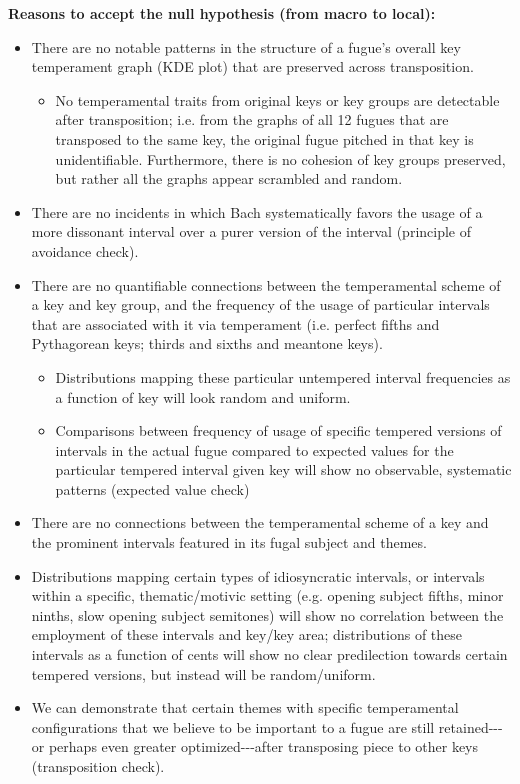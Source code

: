 \textbf{Reasons to accept the null hypothesis (from macro to local):}

\begin{itemize}
\tightlist
\item
  There are no notable patterns in the structure of a fugue's overall
  key temperament graph (KDE plot) that are preserved across
  transposition.

  \begin{itemize}
  \tightlist
  \item
    No temperamental traits from original keys or key groups are
    detectable after transposition; i.e. from the graphs of all 12
    fugues that are transposed to the same key, the original fugue
    pitched in that key is unidentifiable. Furthermore, there is no
    cohesion of key groups preserved, but rather all the graphs appear
    scrambled and random.
  \end{itemize}
\item
  There are no incidents in which Bach systematically favors the usage
  of a more dissonant interval over a purer version of the interval
  (principle of avoidance check).
\item
  There are no quantifiable connections between the temperamental scheme
  of a key and key group, and the frequency of the usage of particular
  intervals that are associated with it via temperament (i.e. perfect
  fifths and Pythagorean keys; thirds and sixths and meantone keys).

  \begin{itemize}
  \tightlist
  \item
    Distributions mapping these particular untempered interval
    frequencies as a function of key will look random and uniform.
  \item
    Comparisons between frequency of usage of specific tempered versions
    of intervals in the actual fugue compared to expected values for the
    particular tempered interval given key will show no observable,
    systematic patterns (expected value check)\\
  \end{itemize}
\item
  There are no connections between the temperamental scheme of a key and
  the prominent intervals featured in its fugal subject and themes.
\item
  Distributions mapping certain types of idiosyncratic intervals, or
  intervals within a specific, thematic/motivic setting (e.g. opening
  subject fifths, minor ninths, slow opening subject semitones) will
  show no correlation between the employment of these intervals and
  key/key area; distributions of these intervals as a function of cents
  will show no clear predilection towards certain tempered versions, but
  instead will be random/uniform.
\item
  We can demonstrate that certain themes with specific temperamental
  configurations that we believe to be important to a fugue are still
  retained-\/-\/-or perhaps even greater optimized-\/-\/-after
  transposing piece to other keys (transposition check).
\end{itemize}

